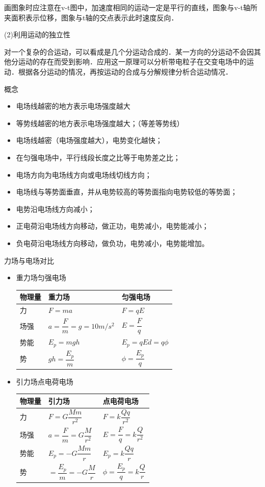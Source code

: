 画图象时应注意在v-t图中，加速度相同的运动一定是平行的直线，图象与v-t轴所夹面积表示位移，图象与t轴的交点表示此时速度反向．

(2)利用运动的独立性

对一个复杂的合运动，可以看成是几个分运动合成的．某一方向的分运动不会因其他分运动的存在而受到影响．应用这一原理可以分析带电粒子在交变电场中的运动．根据各分运动的情况，再按运动的合成与分解规律分析合运动情况．
\newpage
\begin{problemset}

\item 概念
	\begin{itemize}
		\item 电场线越密的地方表示电场强度越大
		\item 等势线越密的地方表示电场强度越大；（等差等势线）
		\item 电场线越密（电场强度越大），电势变化越快；
		\item 在匀强电场中，平行线段长度之比等于电势差之比；
		\item 电场方向为电场线方向或电场线切线方向；
		\item 电场线与等势面垂直，并从电势较高的等势面指向电势较低的等势面；
		\item 电势沿电场线方向减小；
		\item 正电荷沿电场线方向移动，做正功，电势减小，电势能减小；
		\item 负电荷沿电场线方向移动，做负功，电势减小，电势能增加。
	\end{itemize}
\item 力场与电场对比
	\begin{itemize}
		\item 重力场\quad 匀强电场
		\begin{longtable}[]{@{}m{2cm}m{4cm}m{3cm}@{}}
		\toprule
		物理量 & 重力场 & 匀强电场\tabularnewline
		\midrule
		\endhead
		力 & $F=ma$ &$F=qE$\tabularnewline
		场强 &$a=\dfrac{F}{m}=g=10m/s^2$ &$E=\dfrac{F}{q}$\tabularnewline
		
		势能&$E_p=mgh$&$E_p=qEd=q\phi$\tabularnewline
		
		势& $gh=\dfrac{E_p}{m}$& $\phi=\dfrac{E_p}{q}$\tabularnewline
		\bottomrule
		\end{longtable}

		\item 引力场\quad 点电荷电场
		\begin{longtable}[]{@{}m{2cm}m{4cm}m{3cm}@{}}
		\toprule
		物理量 & 引力场 & 点电荷电场\tabularnewline
		\midrule
		\endhead
		力 & $F=G\dfrac{Mm}{r^2}$ &$F=k\dfrac{Qq}{r^2}$\tabularnewline
		场强 &$a=\dfrac{F}{m}=G\dfrac{M}{r^2}$ &$E=\dfrac{F}{q}=k\dfrac{Q}{r^2}$\tabularnewline
		
		势能&$E_p=-G\dfrac{Mm}{r}$&$E_p=k\dfrac{Qq}{r}$\tabularnewline
		
		势& $=\dfrac{E_p}{m}=-G\dfrac{M}{r}$& $\phi=\dfrac{E_p}{q}=k\dfrac{Q}{r}$\tabularnewline
		\bottomrule
		\end{longtable}
	\end{itemize}
\end{problemset}

